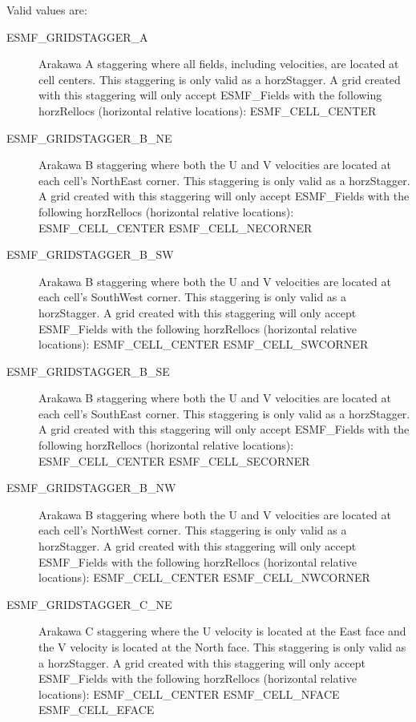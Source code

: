 Valid values are:
\begin{description}
   \item [ESMF\_GRIDSTAGGER\_A]
         Arakawa A staggering where all fields, including velocities, are
         located at cell centers.  This staggering is only valid as a horzStagger.
         A grid created with this staggering will only accept ESMF\_Fields with
         the following horzRellocs (horizontal relative locations):
             ESMF\_CELL\_CENTER

   \item [ESMF\_GRIDSTAGGER\_B\_NE]
         Arakawa B staggering where both the U and V velocities are located at
         each cell's NorthEast corner.  This staggering is only valid as a
         horzStagger.  A grid created with this staggering will only accept
         ESMF\_Fields with the following horzRellocs (horizontal relative locations):
             ESMF\_CELL\_CENTER
             ESMF\_CELL\_NECORNER

   \item [ESMF\_GRIDSTAGGER\_B\_SW]
         Arakawa B staggering where both the U and V velocities are located at
         each cell's SouthWest corner.  This staggering is only valid as a 
         horzStagger.  A grid created with this staggering will only accept
         ESMF\_Fields with the following horzRellocs (horizontal relative locations):
             ESMF\_CELL\_CENTER
             ESMF\_CELL\_SWCORNER

   \item [ESMF\_GRIDSTAGGER\_B\_SE]
         Arakawa B staggering where both the U and V velocities are located at
         each cell's SouthEast corner.  This staggering is only valid as a 
         horzStagger.  A grid created with this staggering will only accept
         ESMF\_Fields with the following horzRellocs (horizontal relative locations):
             ESMF\_CELL\_CENTER
             ESMF\_CELL\_SECORNER

   \item [ESMF\_GRIDSTAGGER\_B\_NW]
         Arakawa B staggering where both the U and V velocities are located at
         each cell's NorthWest corner.  This staggering is only valid as a 
         horzStagger.  A grid created with this staggering will only accept
         ESMF\_Fields with the following horzRellocs (horizontal relative locations):
             ESMF\_CELL\_CENTER
             ESMF\_CELL\_NWCORNER

   \item [ESMF\_GRIDSTAGGER\_C\_NE]
         Arakawa C staggering where the U velocity is located at the East face
         and the V velocity is located at the North face.  This staggering is
         only valid as a horzStagger.  A grid created with this staggering will
         only accept ESMF\_Fields with the following horzRellocs (horizontal
         relative locations):
             ESMF\_CELL\_CENTER
             ESMF\_CELL\_NFACE
             ESMF\_CELL\_EFACE


\end{description}
